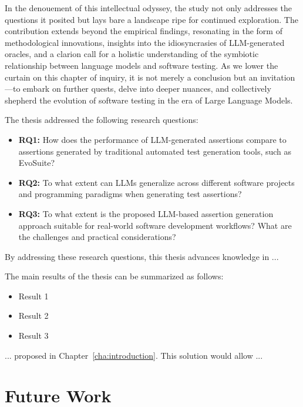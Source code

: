 In the denouement of this intellectual odyssey, the study not only addresses the questions it posited but lays bare a landscape ripe for continued exploration. The contribution extends beyond the empirical findings, resonating in the form of methodological innovations, insights into the idiosyncrasies of LLM-generated oracles, and a clarion call for a holistic understanding of the symbiotic relationship between language models and software testing. As we lower the curtain on this chapter of inquiry, it is not merely a conclusion but an invitation—to embark on further quests, delve into deeper nuances, and collectively shepherd the evolution of software testing in the era of Large Language Models.

The thesis addressed the following research questions:

\begin{itemize}
    \item \textbf{RQ1:} How does the performance of LLM-generated assertions compare to assertions generated by traditional automated test generation tools, such as EvoSuite?

    \item \textbf{RQ2:} To what extent can LLMs generalize across different software projects and programming paradigms when generating test assertions?
    
    \item \textbf{RQ3:} To what extent is the proposed LLM-based assertion generation approach suitable for real-world software development workflows? What are the challenges and practical considerations?
\end{itemize}

By addressing these research questions, this thesis advances knowledge in ...

The main results of the thesis can be summarized as follows:
\begin{itemize}
  \item Result 1
  \item Result 2
  \item Result 3
\end{itemize}

... proposed in Chapter~\ref{cha:introduction}. This solution would allow ...

\section{Future Work}
\label{sec:future_work}
\vspace{0.2 cm}

